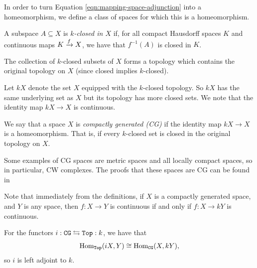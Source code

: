 \documentclass{article}[11pt]
\begin{document}
In order to turn Equation \ref{eqn:mapping-space-adjunction} into a homeomorphism,
we define a class of spaces for which this is a homeomorphism. %

\begin{definition} A subspace $A\subseteq X$ is \textit{$k$-closed in $X$} if, for all compact Hausdorff spaces $K$ and continuous maps $K \xrightarrow{f} X$, we have that $f^{-1}(A)$ is closed in $K$.
\end{definition}

\begin{exercise} The collection of $k$-closed subsets of $X$ forms a topology which contains the original topology on $X$ (since closed implies $k$-closed).
\end{exercise}

Let $kX$ denote the set $X$ equipped with the $k$-closed topology. So $kX$ has the same underlying set as $X$ but its topology has more closed sets. We note that the identity map $kX \to X$ is continuous.

\begin{definition} We say that a space $X$ is \textit{compactly generated (CG)} if the identity map $kX \to X$ is a homeomorphism. That is, if every $k$-closed set is closed in the original topology on $X$.
\end{definition}

Some examples of CG spaces are metric spaces and all locally compact spaces, so in particular, CW complexes. The proofs that these spaces are CG can be found in \cite[Propositions 1.6, 1.7]{Strickland-cgwh}


Note that immediately from the definitions, if $X$ is a compactly generated space, and $Y$ is any space, then $f: X \to Y$ is continuous if and only if $f: X \to kY$ is continuous. 

\begin{upshot} For the functors $i:\texttt{CG} \leftrightarrows \texttt{Top}:k$, we have that
\[
	\textup{Hom}_{\texttt{Top}} (iX,Y) \cong \textup{Hom}_{\texttt{CG}} (X, kY),
\]
so $i$ is left adjoint to $k$.

\end{upshot}
\end{document}
